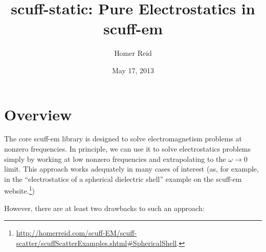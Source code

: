 \documentclass[letterpaper]{article}
\title {{\sc scuff-static}: Pure Electrostatics in {\sc scuff-em}}
\author {Homer Reid}
\date {May 17, 2013}
\begin{document}
\pagestyle{myheadings}
\maketitle

\tableofcontents

\newpage
\section{Overview}

The core {\sc scuff-em} library is designed to solve
electromagnetism problems at nonzero frequencies.
In principle, we can use it to solve electrostatics
problems simply by working at low nonzero frequencies
and extrapolating to the $\omega\to 0$ limit. This
approach works adequately in many cases of interest
(as, for example, in the ``electrostatics of a spherical
dielectric shell'' example on the {\sc scuff-em}
website.\footnote{\url{http://homerreid.com/scuff-EM/scuff-scatter/scuffScatterExamples.shtml#SphericalShell}.})

However, there are at least two drawbacks to such an 
approach:
\end{document}
